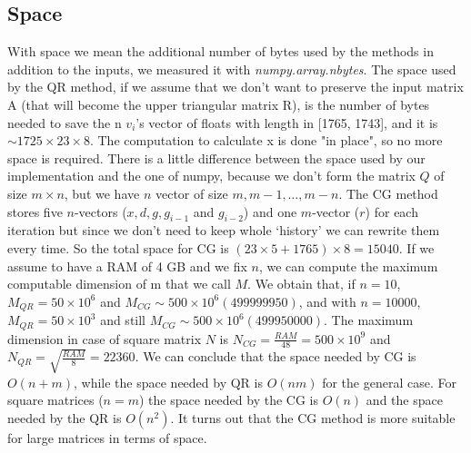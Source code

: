 \documentclass{article}
\begin{document}
\subsection{Space}\label{subsec:space}
With space we mean the additional number of bytes used by the methods in addition to the inputs, we measured it with \textit{numpy.array.nbytes}.
The space used by the QR method, if we assume that we don't want to preserve the input matrix A (that will become the upper triangular matrix R), is the number of bytes needed to save the n $v_{i}$'s vector of floats with length in [1765, 1743], and it is $\sim 1725 \times 23 \times 8$.
The computation to calculate x is done "in place", so no more space is required.
There is a little difference between the space used by our implementation and the one of numpy, because we don't form the matrix $Q$ of size $m \times n$, but we have $n$ vector of size $m, m-1, \dots, m-n$.
The CG method stores five $n$-vectors ($x, d, g, g_{i-1}$ and $g_{i-2}$) and one $m$-vector ($r$) for each iteration but since we don't need to keep whole ‘history’ we can rewrite them every time.
So the total space for CG is $(23\times5 + 1765)\times8 = 15040$.
If we assume to have a RAM of 4 GB and we fix $n$, we can compute the maximum computable dimension of m that we call $M$.
We obtain that, if $n=10$, $M_{QR} = 50 \times 10^{6}$ and $M_{CG}\sim 500 \times 10^{6} (499999950)$, and with $n=10000$, $M_{QR} = 50 \times 10^{3}$ and still $M_{CG} \sim 500\times 10^{6} (499950000)$.
The maximum dimension in case of square matrix $N$ is $N_{CG} = \frac{RAM}{48} = 500 \times 10^{9}$ and $N_{QR} = \sqrt{\frac{RAM}{8}} = 22360$.
We can conclude that the space needed by CG is $O(n+m)$, while the space needed by QR is $O(nm)$ for the general case.
For square matrices ($n=m$) the space needed by the CG is $O(n)$ and the space needed by the QR is $O(n^{2})$.
It turns out that the CG method is more suitable for large matrices in terms of space.
\end{document}
